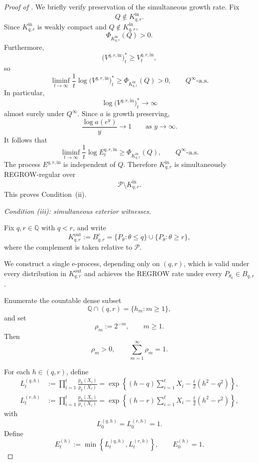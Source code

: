 \documentclass[10pt,a4paper]{amsart}
\begin{document}
\begin{proof}[Proof of ]
We briefly verify preservation of the simultaneous growth rate.
Fix
\[
    Q\notin K_{q,r}^{\mathrm{in}}.
\]
Since $K_{q,r}^{\mathrm{in}}$ is weakly compact and
$Q\notin K_{q,r}^{\mathrm{in}}$,
\[
    \Phi_{K_{q,r}^{\mathrm{in}}}(Q)>0.
\]
Furthermore,
\[
    \bigl(V^{q,r,\mathrm{in}}\bigr)_t^*
    \ge
    V_t^{q,r,\mathrm{in}},
\]
so
\[
    \liminf_{t\to\infty}
    \frac1t
    \log
    \bigl(V^{q,r,\mathrm{in}}\bigr)_t^*
    \ge
    \Phi_{K_{q,r}^{\mathrm{in}}}(Q)
    >0,
    \qquad
    Q^\infty\text{-a.s.}
\]
In particular,
\[
    \log
    \bigl(V^{q,r,\mathrm{in}}\bigr)_t^*
    \longrightarrow\infty
\]
almost surely under $Q^\infty$. Since $a$ is growth preserving,
\[
    \frac{\log a(e^y)}{y}\longrightarrow1
    \qquad\text{as }y\to\infty.
\]
It follows that
\[
    \liminf_{t\to\infty}
    \frac1t
    \log E_t^{q,r,\mathrm{in}}
    \ge
    \Phi_{K_{q,r}^{\mathrm{in}}}(Q),
    \qquad
    Q^\infty\text{-a.s.}
\]
The process $E^{q,r,\mathrm{in}}$ is independent of $Q$.
Therefore $K_{q,r}^{\mathrm{in}}$ is simultaneously
REGROW-regular over
\[
    \mathcal P\setminus K_{q,r}^{\mathrm{in}}.
\]
This proves Condition~\textup{(ii)}.

\medskip

\noindent
\emph{Condition \textup{(iii)}: simultaneous exterior
witnesses.}

Fix $q,r\in\mathbb Q$ with $q<r$, and write
\[
    K_{q,r}^{\mathrm{out}}
    :=
    B_{q,r}^c
    =
    \{P_\theta:\theta\le q\}
    \cup
    \{P_\theta:\theta\ge r\},
\]
where the complement is taken relative to $\mathcal P$.

We construct a single e-process, depending only on $(q,r)$,
which is valid under every distribution in
$K_{q,r}^{\mathrm{out}}$ and achieves the REGROW rate under
every $P_{\theta_0}\in B_{q,r}$.

Enumerate the countable dense subset
\[
    \mathbb Q\cap(q,r)
    =
    \{h_m:m\ge1\},
\]
and set
\[
    \rho_m:=2^{-m},
    \qquad m\ge1.
\]
Then
\[
    \rho_m>0,
    \qquad
    \sum_{m=1}^\infty\rho_m=1.
\]

For each $h\in(q,r)$, define
\begin{align}
    L_t^{(q,h)}
    &:=
    \prod_{i=1}^t
    \frac{p_h(X_i)}{p_q(X_i)}
    =
    \exp\left\{
        (h-q)\sum_{i=1}^tX_i
        -
        \frac t2(h^2-q^2)
    \right\},
    \label{eq:gaussian-left-lr}\\
    L_t^{(r,h)}
    &:=
    \prod_{i=1}^t
    \frac{p_h(X_i)}{p_r(X_i)}
    =
    \exp\left\{
        (h-r)\sum_{i=1}^tX_i
        -
        \frac t2(h^2-r^2)
    \right\},
    \label{eq:gaussian-right-lr}
\end{align}
with
\[
    L_0^{(q,h)}=L_0^{(r,h)}=1.
\]
Define
\[
    E_t^{(h)}
    :=
    \min\left\{
        L_t^{(q,h)},
        L_t^{(r,h)}
    \right\},
    \qquad
    E_0^{(h)}=1.
\]


\end{proof}
\end{document}
